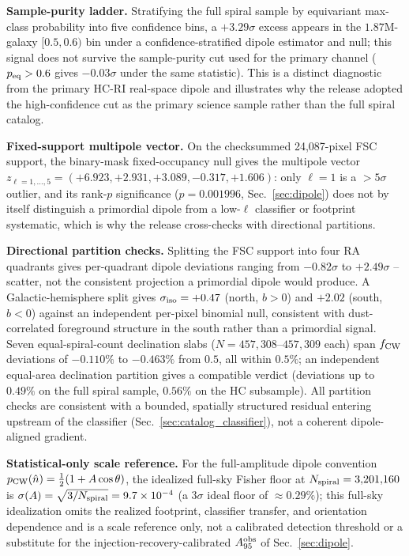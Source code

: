 \documentclass[twocolumn,linenumbers]{aastex702}
\newcommand{\HCRI}{\textsc{HC-RI}}
\newcommand{\FSC}{\textsc{FSC}}
\begin{document}
\textbf{Sample-purity ladder.} Stratifying the full spiral sample by
equivariant max-class probability into five confidence bins, a
$+3.29\sigma$ excess appears in the $1.87$M-galaxy $[0.5,0.6)$ bin under a
confidence-stratified dipole estimator and null; this signal does not
survive the sample-purity cut used for the primary channel ($p_{\rm
eq}>0.6$ gives $-0.03\sigma$ under the same statistic). This is a distinct
diagnostic from the primary \HCRI{} real-space dipole and illustrates why
the release adopted the high-confidence cut as the primary science sample
rather than the full spiral catalog.

\textbf{Fixed-support multipole vector.} On the checksummed 24,087-pixel
\FSC{} support, the binary-mask fixed-occupancy null gives the multipole
vector $z_{\ell=1,\ldots,5}=(+6.923,+2.931,+3.089,-0.317,+1.606)$: only
$\ell=1$ is a $>5\sigma$ outlier, and its rank-$p$ significance
($p=0.001996$, Sec.~\ref{sec:dipole}) does not by itself distinguish a
primordial dipole from a low-$\ell$ classifier or footprint systematic,
which is why the release cross-checks with directional partitions.

\textbf{Directional partition checks.} Splitting the \FSC{} support into
four RA quadrants gives per-quadrant dipole deviations ranging from
$-0.82\sigma$ to $+2.49\sigma$ -- scatter, not the consistent projection a
primordial dipole would produce. A Galactic-hemisphere split gives
$\sigma_{\rm iso}=+0.47$ (north, $b>0$) and $+2.02$ (south, $b<0$) against
an independent per-pixel binomial null, consistent with dust-correlated
foreground structure in the south rather than a primordial signal. Seven
equal-spiral-count declination slabs ($N=457{,}308$--$457{,}309$ each) span
$f_{\rm CW}$ deviations of $-0.110\%$ to $-0.463\%$ from $0.5$, all within
$0.5\%$; an independent equal-area declination partition gives a compatible
verdict (deviations up to $0.49\%$ on the full spiral sample, $0.56\%$ on
the HC subsample). All partition checks are consistent with a bounded,
spatially structured residual entering upstream of the classifier
(Sec.~\ref{sec:catalog_classifier}), not a coherent dipole-aligned
gradient.

\textbf{Statistical-only scale reference.} For the full-amplitude dipole
convention $p_{\rm CW}(\hat n)=\tfrac12(1+A\cos\theta)$, the idealized
full-sky Fisher floor at $N_{\rm spiral}=3{,}201{,}160$ is
$\sigma(A)=\sqrt{3/N_{\rm spiral}}=9.7\times10^{-4}$ (a $3\sigma$ ideal
floor of $\approx0.29\%$); this full-sky idealization omits the realized
footprint, classifier transfer, and orientation dependence and is a scale
reference only, not a calibrated detection threshold or a substitute for
the injection-recovery-calibrated $A_{95}^{\rm obs}$ of
Sec.~\ref{sec:dipole}.
\end{document}
